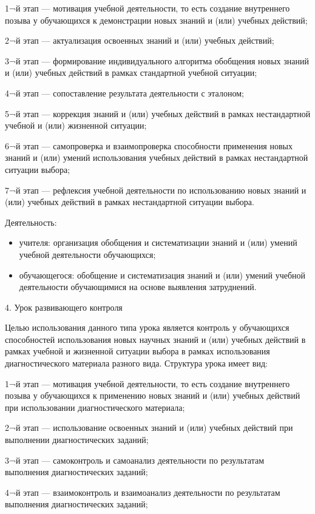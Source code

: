 \documentclass[
  11pt,
]{book}
\begin{document}
1¬й этап --- мотивация учебной деятельности, то есть создание внутреннего позыва у обучающихся к демонстрации новых знаний и (или) учебных действий;

2¬й этап --- актуализация освоенных знаний и (или) учебных действий;

3¬й этап --- формирование индивидуального алгоритма обобщения новых знаний и (или) учебных действий в рамках стандартной учебной ситуации;

4¬й этап --- сопоставление результата деятельности с эталоном;

5¬й этап --- коррекция знаний и (или) учебных действий в рамках нестандартной учебной и (или) жизненной ситуации;

6¬й этап --- самопроверка и взаимопроверка способности применения новых знаний и (или) умений использования учебных действий в рамках нестандартной ситуации выбора;

7¬й этап --- рефлексия учебной деятельности по использованию новых знаний и (или) учебных действий в рамках нестандартной ситуации выбора.

Деятельность:

\begin{itemize}
\item
  учителя: организация обобщения и систематизации знаний и (или) умений учебной деятельности обучающихся;
\item
  обучающегося: обобщение и систематизация знаний и (или) умений учебной деятельности обучающимися на основе выявления затруднений.
\end{itemize}

4. Урок развивающего контроля

Целью использования данного типа урока является контроль у обучающихся способностей использования новых научных знаний и (или) учебных действий в рамках учебной и жизненной ситуации выбора в рамках использования диагностического материала разного вида. Структура урока имеет вид:

1¬й этап --- мотивация учебной деятельности, то есть создание внутреннего позыва у обучающихся к применению новых знаний и (или) учебных действий при использовании диагностического материала;

2¬й этап --- использование освоенных знаний и (или) учебных действий при выполнении диагностических заданий;

3¬й этап --- самоконтроль и самоанализ деятельности по результатам выполнения диагностических заданий;

4¬й этап --- взаимоконтроль и взаимоанализ деятельности по результатам выполнения диагностических заданий;
\end{document}

